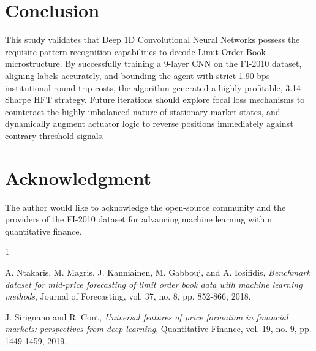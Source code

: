 \documentclass[journal]{IEEEtran}
\begin{document}
\section{Conclusion}
This study validates that Deep 1D Convolutional Neural Networks possess the requisite pattern-recognition capabilities to decode Limit Order Book microstructure. By successfully training a 9-layer CNN on the FI-2010 dataset, aligning labels accurately, and bounding the agent with strict 1.90 bps institutional round-trip costs, the algorithm generated a highly profitable, 3.14 Sharpe HFT strategy. Future iterations should explore focal loss mechanisms to counteract the highly imbalanced nature of stationary market states, and dynamically augment actuator logic to reverse positions immediately against contrary threshold signals.

\section*{Acknowledgment}
The author would like to acknowledge the open-source community and the providers of the FI-2010 dataset for advancing machine learning within quantitative finance.

\begin{thebibliography}{1}

A. Ntakaris, M. Magris, J. Kanniainen, M. Gabbouj, and A. Iosifidis, \emph{Benchmark dataset for mid-price forecasting of limit order book data with machine learning methods}, Journal of Forecasting, vol. 37, no. 8, pp. 852-866, 2018.

J. Sirignano and R. Cont, \emph{Universal features of price formation in financial markets: perspectives from deep learning}, Quantitative Finance, vol. 19, no. 9, pp. 1449-1459, 2019.

\end{thebibliography}
\end{document}
